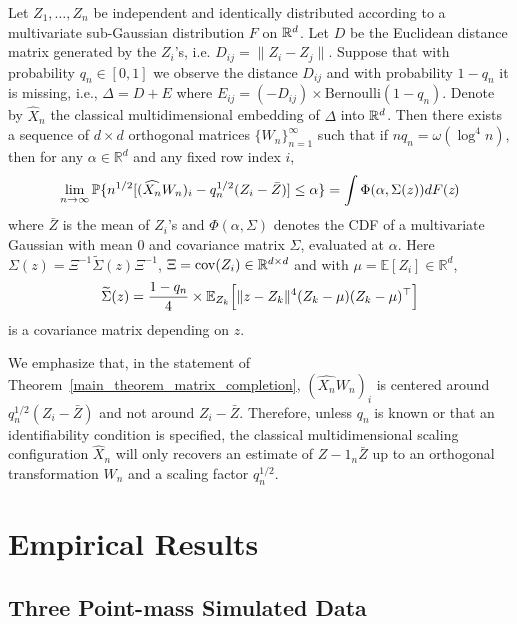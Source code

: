 \begin{theorem}[Central Limit Theorem for $\Delta = D$ with missing entries]
\label{main_theorem_matrix_completion} Let $Z_1, \dots, Z_n$ be
independent and identically distributed according to a multivariate sub-Gaussian distribution $F$ on $\R^d$. Let $D$ be the
Euclidean distance matrix generated by the $Z_i$'s, i.e. $D_{ij} =
\|Z_i - Z_j\|$. Suppose that with probability $q_n \in [0,1]$ we
observe the distance $D_{ij}$ and with probability $1 - q_n$ it is
missing, i.e., $\Delta = D + E$ where $E_{ij} = (- D_{ij}) \times
\mathrm{Bernoulli}(1-q_n)$. Denote by $\hat{X}_n$ the classical
multidimensional embedding of $\Delta$ into $\R^d$.  Then there exists a sequence
of $d \times d$ orthogonal matrices $\{W_n\}_{n=1}^{\infty}$ such that
if $n q_n = \omega(\log^{4}{n})$, then for any $\alpha \in
\mathbb{R}^{d}$ and any fixed row index $i$,
  $$ \lim_{n {\to} \infty} \mathbb{P} \{n^{1/2} [(\hat{X_n}W_n)_{i} - q_n^{1/2} (Z_i - \bar{Z})] \leq \alpha\} = \int \Phi(\alpha, \Sigma(z)) dF(\emph{z})$$
  where $\bar{Z}$ is the mean of $Z_i$'s and $\Phi(\alpha, \Sigma)$ denotes the CDF of a multivariate Gaussian with mean $0$ and covariance matrix $\Sigma$, evaluated at $\alpha$. Here $\Sigma (z)= {\Xi}^{-1} \widetilde{\Sigma}(z) {\Xi}^{-1}$, $\Xi = \mathrm{cov}(Z_i) \in \R^{d \times d}$ and with $\mu = \mathbb{E}[Z_i] \in \mathbb{R}^{d}$,
  $$\widetilde{\Sigma} (z) = \frac{1-q_n}{4} \times \mathbb{E}_{Z_k} \Bigl[ \|z - Z_k\|^4 (Z_k- {\mu}) (Z_k - {\mu})^\top\Bigr]$$ 
  is a covariance matrix depending on $z$. 
\end{theorem}
\begin{remark}
We emphasize that, in the statement of Theorem~\ref{main_theorem_matrix_completion}, 
$(\hat{X_n}W_n)_{i}$ is centered around $q_n^{1/2}(Z_i - \bar{Z})$ and not around $Z_i - \bar{Z}$. Therefore, unless $q_n$ is known or that an identifiability condition is specified, the classical multidimensional scaling configuration $\hat{X}_n$ will only recovers an estimate of $Z - 1_n \bar{Z}$ up to an orthogonal transformation $W_n$ and a scaling factor $q_n^{1/2}$.
\end{remark}

\section{Empirical Results}
\label{ER}

\subsection{Three Point-mass Simulated Data}
\label{SD}

